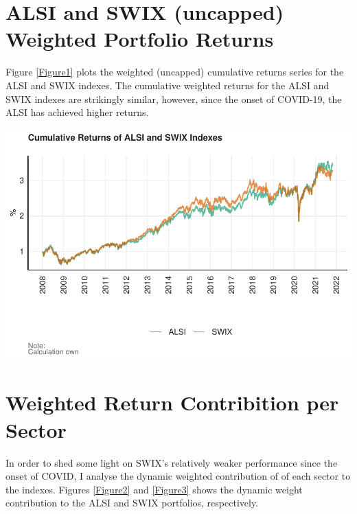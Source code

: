 \documentclass[11pt,preprint, authoryear]{elsarticle}
\let\origfigure\figure
\let\endorigfigure\endfigure
\renewenvironment{figure}[1][2] {
    \expandafter\origfigure\expandafter[H]
} {
    \endorigfigure
}
\numberwithin{equation}{section}
\numberwithin{figure}{section}
\numberwithin{table}{section}
\begin{document}
\headsep 35pt %




\hypertarget{alsi-and-swix-uncapped-weighted-portfolio-returns}{%
\section{ALSI and SWIX (uncapped) Weighted Portfolio
Returns}\label{alsi-and-swix-uncapped-weighted-portfolio-returns}}

Figure \ref{Figure1} plots the weighted (uncapped) cumulative returns
series for the ALSI and SWIX indexes. The cumulative weighted returns
for the ALSI and SWIX indexes are strikingly similar, however, since the
onset of COVID-19, the ALSI has achieved higher returns.

\begin{figure}[H]

{\centering \includegraphics{Question3_files/figure-latex/Indexes_Cum_ret_plot-1} 

}

\caption{Cumulative Returns of ALSI and SWIX Indexes Per Sector. \label{Figure1}}\label{fig:Indexes_Cum_ret_plot}
\end{figure}

\hypertarget{weighted-return-contribition-per-sector}{%
\section{Weighted Return Contribition per
Sector}\label{weighted-return-contribition-per-sector}}

In order to shed some light on SWIX's relatively weaker performance
since the onset of COVID, I analyse the dynamic weighted contribution of
of each sector to the indexes. Figures \ref{Figure2} and \ref{Figure3}
shows the dynamic weight contribution to the ALSI and SWIX portfolios,
respectively.
\end{document}
